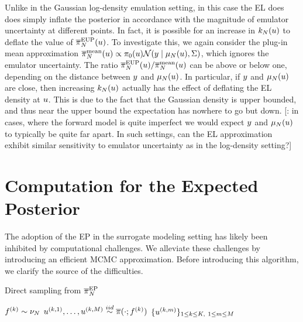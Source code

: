 \documentclass[12pt]{article}
\begin{document}
Unlike in the Gaussian log-density emulation setting, in this case the EL does does simply 
inflate the posterior in accordance with the magnitude of emulator uncertainty at different points.
In fact, it is possible for an increase in $k_{N}(u)$ to deflate the value of $\overline{\pi}_{N}^{\mathrm{EUP}}(u)$.
To investigate this, we again consider the plug-in mean approximation
$\overline{\pi}_{N}^{\mathrm{mean}}(u) \propto \pi_0(u) \mathcal{N}(y \mid \mu_{N}(u), \Sigma)$,
which ignores the emulator uncertainty. The ratio 
$\overline{\pi}_{N}^{\mathrm{EUP}}(u)/\overline{\pi}_{N}^{\mathrm{mean}}(u)$ can be above 
or below one, depending on the distance between $y$ and $\mu_{N}(u)$. In particular,
if $y$ and $\mu_{N}(u)$ are close, then increasing $k_{N}(u)$ actually has the effect
of deflating the EL density at $u$. This is due to the fact that the Gaussian density is 
upper bounded, and thus near the upper bound the expectation has nowhere to go but down.
[\todo: in cases, where the forward model is quite imperfect we would expect $y$ and $\mu_{N}(u)$
to typically be quite far apart. In such settings, can the EL approximation exhibit similar sensitivity to 
emulator uncertainty as in the log-density setting?]
 
\section{Computation for the Expected Posterior} \label{sec:computation}
The adoption of the EP in the surrogate modeling setting has likely been 
inhibited by computational challenges. We alleviate these challenges 
by introducing an efficient MCMC approximation. Before introducing this 
algorithm, we clarify the source of the difficulties. 

\begin{algorithm}
    \caption{Direct sampling from $\overline{\pi}_{N}^{\mathrm{EP}}$}
    \label{alg:ep}
    \begin{algorithmic}[1]
        		\State $f^{(k)} \sim \nu_{N}$ 
		\State $u^{(k, 1)}, \dots, u^{(k, M)} \overset{iid}{\sim} \overline{\pi}(\cdot; f^{(k)})$ 
	\EndFor
	\State \Return $\{u^{(k, m)}\}_{1 \leq k \leq K, \ 1 \leq m \leq M}$
	\EndFunction
    \end{algorithmic}
\end{algorithm}
\end{document}

